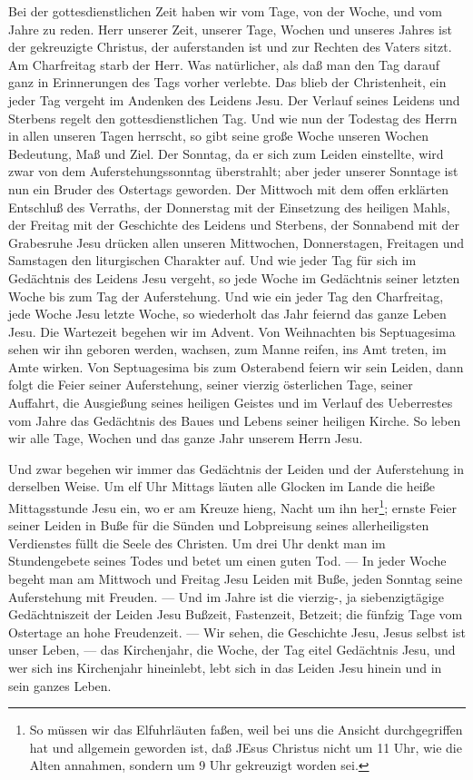 Bei der gottesdienstlichen Zeit haben wir vom Tage, von der Woche, und vom Jahre zu reden. Herr unserer Zeit, unserer Tage, Wochen und unseres Jahres ist der gekreuzigte Christus, der auferstanden ist und zur Rechten des Vaters sitzt. Am Charfreitag starb der Herr. Was natürlicher, als daß man den Tag darauf ganz in Erinnerungen des Tags vorher verlebte. Das blieb der Christenheit, ein jeder Tag vergeht im Andenken des Leidens Jesu. Der Verlauf seines Leidens und Sterbens regelt den gottesdienstlichen Tag. Und wie nun der Todestag des Herrn in allen unseren Tagen herrscht, so gibt seine große Woche unseren Wochen Bedeutung, Maß und Ziel. Der Sonntag, da er sich zum Leiden einstellte, wird zwar von dem Auferstehungssonntag überstrahlt; aber jeder unserer Sonntage ist nun ein Bruder des Ostertags geworden. Der Mittwoch mit dem offen erklärten
Entschluß des Verraths, der Donnerstag mit der Einsetzung des heiligen Mahls, der Freitag mit der Geschichte des Leidens und Sterbens, der Sonnabend mit der Grabesruhe Jesu drücken allen unseren Mittwochen, Donnerstagen, Freitagen und Samstagen den liturgischen Charakter auf. Und wie jeder Tag für sich im Gedächtnis des Leidens Jesu vergeht, so jede Woche im Gedächtnis seiner letzten Woche bis zum Tag der Auferstehung. Und wie ein jeder Tag den Charfreitag, jede Woche Jesu letzte Woche, so wiederholt das Jahr feiernd das ganze Leben Jesu. Die Wartezeit begehen wir im Advent. Von Weihnachten bis Septuagesima sehen wir ihn geboren werden, wachsen, zum Manne reifen, ins Amt treten, im Amte wirken. Von Septuagesima bis zum Osterabend feiern wir sein Leiden, dann folgt die Feier seiner Auferstehung, seiner vierzig österlichen Tage, seiner Auffahrt, die Ausgießung seines heiligen Geistes und im Verlauf des Ueberrestes vom Jahre das Gedächtnis des Baues und Lebens seiner heiligen Kirche. So leben wir alle Tage, Wochen und das ganze Jahr unserem Herrn Jesu.

Und zwar begehen wir immer das Gedächtnis der Leiden und der Auferstehung in derselben Weise. Um elf Uhr Mittags läuten alle Glocken im Lande die heiße Mittagsstunde Jesu ein, wo er am Kreuze hieng, Nacht um ihn her\footnote{So müssen wir das Elfuhrläuten faßen, weil bei uns die Ansicht durchgegriffen hat und allgemein geworden ist, daß JEsus Christus nicht um 11 Uhr, wie die Alten annahmen, sondern um 9 Uhr gekreuzigt worden sei.};
ernste Feier seiner Leiden in Buße für die Sünden und Lobpreisung seines allerheiligsten Verdienstes füllt die Seele des Christen. Um drei Uhr denkt man im Stundengebete seines Todes und betet um einen guten Tod. — In jeder Woche begeht man am Mittwoch und Freitag Jesu Leiden mit Buße, jeden Sonntag seine Auferstehung mit Freuden. — Und im Jahre ist die vierzig-, ja siebenzigtägige Gedächtniszeit der Leiden Jesu Bußzeit, Fastenzeit, Betzeit; die fünfzig Tage vom Ostertage an hohe Freudenzeit. — Wir sehen, die Geschichte Jesu, Jesus selbst ist unser Leben, — das Kirchenjahr, die Woche, der Tag eitel Gedächtnis Jesu, und wer sich ins Kirchenjahr hineinlebt, lebt sich in das Leiden Jesu hinein und in sein ganzes Leben.

